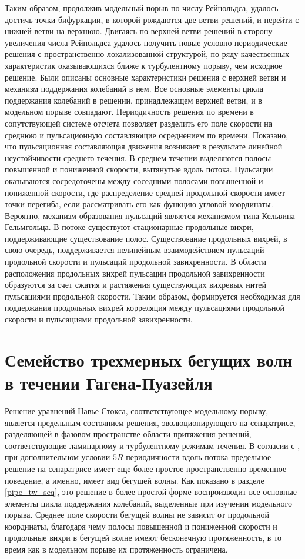 Таким образом, продолжив модельный порыв по числу Рейнольдса, удалось достичь точки бифуркации, в которой рождаются две ветви решений, и перейти с нижней ветви на верхнюю. Двигаясь по верхней ветви решений в сторону увеличения числа Рейнольдса удалось получить новые условно периодические решения с пространственно-локализованной структурой, по ряду качественных характеристик оказывающихся ближе к турбулентному порыву, чем исходное решение. Были описаны основные характеристики решения с верхней ветви и механизм поддержания колебаний в нем. Все основные элементы цикла поддержания колебаний в решении, принадлежащем верхней ветви, и в модельном порыве совпадают. Периодичность решения по времени в сопутствующей системе отсчета позволяет разделить его поле скорости на среднюю и пульсационную составляющие осреднением по времени. Показано, что пульсационная составляющая движения возникает в результате линейной неустойчивости среднего течения. В среднем течении выделяются полосы повышенной и пониженной скорости, вытянутые вдоль потока. Пульсации оказываются сосредоточены между соседними полосами повышенной и пониженной скорости, где распределение средней продольной скорости имеет точки перегиба, если рассматривать его как функцию угловой координаты. Вероятно, механизм образования пульсаций является механизмом типа Кельвина--Гельмгольца. В потоке существуют стационарные продольные вихри, поддерживающие существование полос. Существование продольных вихрей, в свою очередь, поддерживается нелинейным взаимодействием пульсаций продольной скорости и пульсаций продольной завихренности. В области расположения продольных вихрей пульсации продольной завихренности образуются за счет сжатия и растяжения существующих вихревых нитей пульсациями продольной скорости. Таким образом, формируется необходимая для поддержания продольных вихрей корреляция между пульсациями продольной скорости и пульсациями продольной завихренности. 


\section{Семейство трехмерных бегущих волн в течении Гагена-Пуазейля} \label{pipeTW_seq}

Решение уравнений Навье-Стокса, соответствующее модельному порыву, является предельным состоянием решения, эволюционирующего на сепаратрисе, разделяющей в фазовом пространстве области притяжения решений, соответствующие ламинарному и турбулентному режимам течения. В согласии с \cite{Avila2013}, при дополнительном условии $5R$ периодичности вдоль потока предельное решение на сепаратрисе имеет еще более простое пространственно-временное поведение, а именно, имеет вид бегущей волны. Как показано в разделе \ref{pipe_tw_seq}, это решение в более простой форме воспроизводит все основные элементы цикла поддержания колебаний, выделенные при изучении модельного порыва. Среднее поле скорости бегущей волны не зависит от продольной координаты, благодаря чему полосы повышенной и пониженной скорости и продольные вихри в бегущей волне имеют бесконечную протяженность, в то время как в модельном порыве их протяженность ограничена. 

